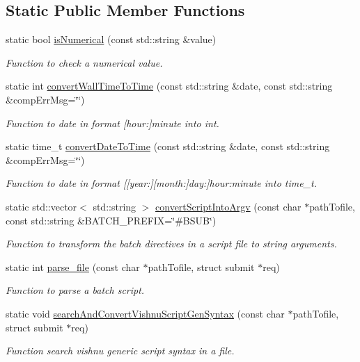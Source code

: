 \subsection*{Static Public Member Functions}
\begin{DoxyCompactItemize}
\item 
static bool \hyperlink{classLSFParser_a0f98e3bf5de259376f179f90359a1978}{isNumerical} (const std::string \&value)
\begin{DoxyCompactList}\small\item\em Function to check a numerical value. \item\end{DoxyCompactList}\item 
static int \hyperlink{classLSFParser_a99b5d60ac414871851810a60d6dd4df9}{convertWallTimeToTime} (const std::string \&date, const std::string \&compErrMsg=\char`\"{}\char`\"{})
\begin{DoxyCompactList}\small\item\em Function to date in format \mbox{[}hour:\mbox{]}minute into int. \item\end{DoxyCompactList}\item 
static time\_\-t \hyperlink{classLSFParser_a9e09af56ac1f1deda32c88d773ba32b8}{convertDateToTime} (const std::string \&date, const std::string \&compErrMsg=\char`\"{}\char`\"{})
\begin{DoxyCompactList}\small\item\em Function to date in format \mbox{[}\mbox{[}year:\mbox{]}\mbox{[}month:\mbox{]}day:\mbox{]}hour:minute into time\_\-t. \item\end{DoxyCompactList}\item 
static std::vector$<$ std::string $>$ \hyperlink{classLSFParser_a6d543399c7e7f45775f40c242f9ac66e}{convertScriptIntoArgv} (const char $\ast$pathTofile, const std::string \&BATCH\_\-PREFIX=\char`\"{}\#BSUB\char`\"{})
\begin{DoxyCompactList}\small\item\em Function to transform the batch directives in a script file to string arguments. \item\end{DoxyCompactList}\item 
static int \hyperlink{classLSFParser_ae570e490cd86f3f28be224a873306933}{parse\_\-file} (const char $\ast$pathTofile, struct submit $\ast$req)
\begin{DoxyCompactList}\small\item\em Function to parse a batch script. \item\end{DoxyCompactList}\item 
static void \hyperlink{classLSFParser_a8a4846ebc4d91a76bdfb43599ed134af}{searchAndConvertVishnuScriptGenSyntax} (const char $\ast$pathTofile, struct submit $\ast$req)
\begin{DoxyCompactList}\small\item\em Function search vishnu generic script syntax in a file. \item\end{DoxyCompactList}\end{DoxyCompactItemize}


